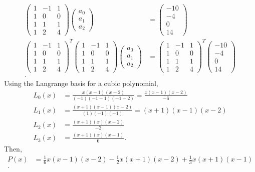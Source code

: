 \documentclass[5pt, a4paper]{article}
\begin{document}
\begin{align*}
    \begin{pmatrix} 
        1 & -1 & 1\\ 
        1 & 0 & 0 \\
        1 & 1 & 1 \\ 
        1 & 2 & 4 
    \end{pmatrix} 
    \begin{pmatrix} a_0 \\ a_1 \\ a_2 \end{pmatrix} 
    &= \begin{pmatrix} -10 \\ -4 \\ 0 \\ 14 \end{pmatrix}  \\
    \begin{pmatrix} 
        1 & -1 & 1 \\ 
        1 & 0 & 0 \\
        1 & 1 & 1 \\ 
        1 & 2 & 4 
    \end{pmatrix}^T
    \begin{pmatrix} 
        1 & -1 & 1 \\ 
        1 & 0 & 0 \\
        1 & 1 & 1 \\ 
        1 & 2 & 4 
    \end{pmatrix} 
    \begin{pmatrix} a_0 \\ a_1 \\ a_2 \end{pmatrix} 
    &=
    \begin{pmatrix} 
        1 & -1 & 1 \\ 
        1 & 0 & 0 \\
        1 & 1 & 1 \\ 
        1 & 2 & 4 
    \end{pmatrix}^T
    \begin{pmatrix} -10 \\ -4 \\ 0 \\ 14 \end{pmatrix}  \\
.\end{align*}
Using the Langrange basis for a cubic polynomial,
\begin{align*}
    L_0(x) &= \frac{x(x-1)(x-2)}{(-1)(-1-1)(-1-2)}
           = \frac{x(x-1)(x-2)}{-6} \\
    L_1(x) &= \frac{(x+1)(x-1)(x-2)}{(1)(-1)(-1)}
           =  (x+1)(x-1)(x-2)\\
    L_2(x) &= \frac{(x+1)(x)(x-2)}{-2}\\
    L_3(x) &= \frac{(x+1)(x)(x-1)}{6} 
.\end{align*}
Then,
\begin{align*}
    P(x) &= \frac{1}{6}x(x-1)(x-2) - \frac{1}{2}x(x+1)(x-2) +
    \frac{1}{3}x(x+1)(x-1)\\
.\end{align*}
\end{document}
